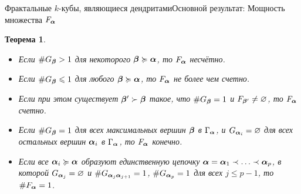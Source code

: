 \documentclass[aspectratio=1610, 10pt, notheorems]{beamer}
\newtheorem{theorem}     {Теорема}
\begin{document}
\begin{frame}{Фрактальные $k$-кубы, являющиеся дендритами}{Основной результат: Мощность множества $F_{\bm{\alpha}}$}
\begin{theorem}
\begin{itemize} %
\item[(1)] Если $\#G_{\bm{\beta}}>1$ для некоторого ${\bm{\beta}}\succcurlyeq{\bm{\alpha}}$, то  $F_{\bm{\alpha}}$ несчётно.

\item[(2a)] Если  $\#G_{\bm{\beta}}\leqslant1$ для любого ${\bm{\beta}}\succcurlyeq{\bm{\alpha}}$, то  $F_{\bm{\alpha}}$ не более чем счетно.

\item[(2b)] Если при этом существует ${\bm{\beta}}'\succ{\bm{\beta}}$ такое, что $\#G_{\bm{\beta}}=1$ и $F_{{\bm{\beta}}'}\neq\varnothing$, то $F_{\bm{\alpha}}$ счетно.

\item[(3)] Если  $\#G_{\bm{\beta}}=1$ для всех максимальных вершин ${\bm{\beta}}$ в $\Gamma_{\bm{\alpha}}$, и $G_{{\bm{\alpha}}_i}=\varnothing$ для всех остальных вершин ${\bm{\alpha}}_i$ в $\Gamma_{\bm{\alpha}}$, то $F_{\bm{\alpha}}$ конечно.

\item[(4)] Если все ${\bm{\alpha}}_i\succcurlyeq{\bm{\alpha}}$ образуют единственную цепочку ${\bm{\alpha}}={\bm{\alpha}}_1\prec\ldots\prec{\bm{\alpha}}_p$, в которой $G_{{\bm{\alpha}}_j}=\varnothing$ и $\# G_{{\bm{\alpha}}_j{\bm{\alpha}}_{j+1}}=1$, $\#G_{{\bm{\alpha}}_p}=1$ для всех $j\le p-1$, то $\#F_{\bm{\alpha}}=1$.
\end{itemize}
\end{theorem}
\end{frame}
\end{document}
